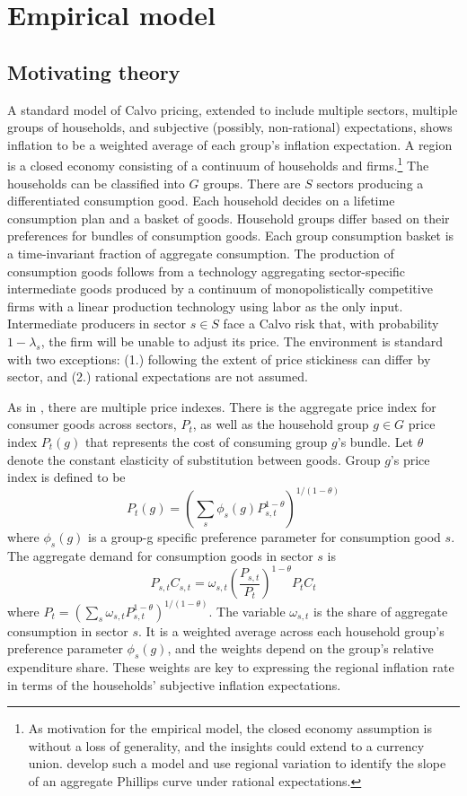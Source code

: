 \documentclass[12pt]{article}
\begin{document}
\section{Empirical model}

\subsection{Motivating theory}

A standard model of Calvo pricing, extended to include multiple sectors, multiple groups of households, and subjective (possibly, non-rational) expectations, shows inflation to be a weighted average of each group's inflation expectation. A region is a closed economy consisting of a continuum of households and firms.\footnote{As motivation for the empirical model, the closed economy assumption is without a loss of generality, and the insights could extend to a currency union. \cite{NakamuraSteinsson:QJE2022} develop such a model and use regional variation to identify the slope of an aggregate Phillips curve under rational expectations.} The households can be classified into $G$ groups. There are $S$ sectors producing a differentiated consumption good. Each household decides on a lifetime consumption plan and a basket of goods. Household groups differ based on their preferences for bundles of consumption goods. Each group consumption basket is a time-invariant fraction of aggregate consumption. The production of consumption goods follows from a technology aggregating sector-specific intermediate goods produced by a continuum of monopolistically competitive firms with a linear production technology using labor as the only input. Intermediate producers in sector $s\in S$ face a Calvo risk that, with probability $1-\lambda_s$, the firm will be unable to adjust its price. The environment is standard with two exceptions: (1.) following \cite{Cravinoetal:JME2020} the extent of price stickiness can differ by sector, and (2.) rational expectations are not assumed.

As in \cite{Cravinoetal:JME2020}, there are multiple price indexes. There is the aggregate price index for consumer goods across sectors, $P_t$, as well as the household group $g\in G$ price index $P_t(g)$ that represents the cost of consuming group $g$'s bundle. Let $\theta$ denote the constant elasticity of substitution between goods. Group $g$'s price index is defined to be
$$ P_t(g) = \left( \sum_s \phi_s(g)P^{1-\theta}_{s,t}\right)^{1/(1-\theta)}$$
where $\phi_s(g)$ is a group-g specific preference parameter for consumption good $s$. The aggregate demand for consumption goods in sector $s$ is
$$ P_{s,t}C_{s,t} = \omega_{s,t}\left(\frac{P_{s,t}}{P_t}\right)^{1-\theta} P_tC_t$$
where $P_t=\left(\sum_s\omega_{s,t}P_{s,t}^{1-\theta}\right)^{1/(1-\theta)}$. The variable $\omega_{s,t}$ is the share of aggregate consumption in sector $s$. It is a weighted average across each household group's preference parameter $\phi_s(g)$, and the weights depend on the group's relative expenditure share. These weights are key to expressing the regional inflation rate in terms of the households' subjective inflation expectations.
\end{document}
